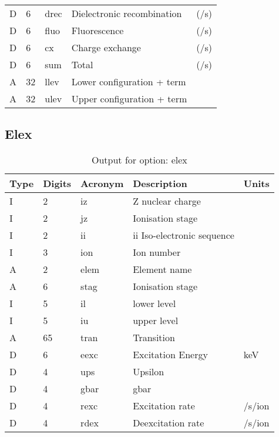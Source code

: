\begin{table}[!p]
\begin{tabular}{lllll}
D &  6 & drec & Dielectronic recombination       & (/s)             \\
D &  6 & fluo & Fluorescence                     & (/s)             \\
D &  6 & cx   & Charge exchange                  & (/s)             \\
D &  6 & sum  & Total                            & (/s)             \\
A & 32 & llev & Lower configuration + term       &                  \\
A & 32 & ulev & Upper configuration + term       &                  \\
\hline
\end{tabular}
\end{table}

\subsection{Elex}

\begin{table}[!p]
\caption{Output for option: elex}
\label{tabout:elex}
\begin{tabular}{lllll}
\hline
Type & Digits & Acronym & Description & Units \\ 
\hline
I &  2 & iz   & Z nuclear charge                 &                  \\
I &  2 & jz   & Ionisation stage                 &                  \\
I &  2 & ii   & ii Iso-electronic sequence       &                  \\
I &  3 & ion  & Ion number                       &                  \\
A &  2 & elem & Element name                     &                  \\
A &  6 & stag & Ionisation stage                 &                  \\
I &  5 & il   & lower level                      &                  \\
I &  5 & iu   & upper level                      &                  \\
A & 65 & tran & Transition                       &                  \\
D &  6 & eexc & Excitation Energy                & keV              \\
D &  4 & ups  & Upsilon                          &                  \\
D &  4 & gbar & gbar                             &                  \\
D &  4 & rexc & Excitation rate                  & /s/ion           \\
D &  4 & rdex & Deexcitation rate                & /s/ion           \\
\hline
\end{tabular}
\end{table}


